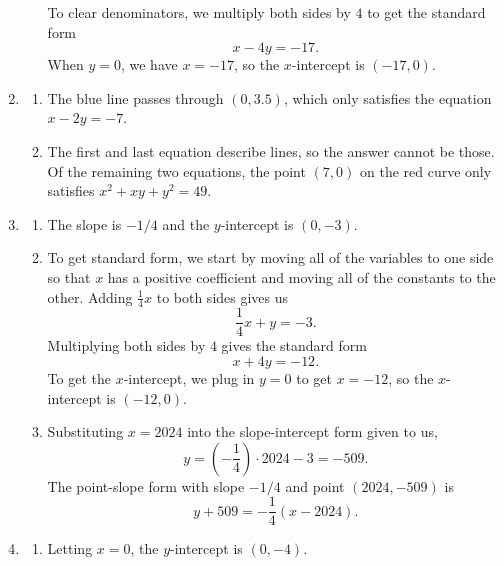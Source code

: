 \begin{enumerate}
\begin{enumerate}
To clear denominators, we multiply both sides by $4$ to get the standard form 
\begin{equation*}
\boxed{x - 4y = -17}.
\end{equation*}
When $y = 0$, we have $x = -17$, so the $x$-intercept is $\boxed{(-17, 0)}$.
\end{enumerate}
\item \begin{enumerate}
\item The blue line passes through $(0, 3.5)$, which only satisfies the equation $\boxed{x - 2y = -7}$.
\item The first and last equation describe lines, so the answer cannot be those. Of the remaining two equations, the point $(7,0)$ on the red curve only satisfies $\boxed{x^2 + xy + y^2 = 49}$.
\end{enumerate}
\item \begin{enumerate}
\item The slope is $\boxed{-1/4}$ and the $y$-intercept is $\boxed{(0,-3)}$.
\item To get standard form, we start by moving all of the variables to one side so that $x$ has a positive coefficient and moving all of the constants to the other. Adding $\frac{1}{4}x$ to both sides gives us 
\begin{equation*}
\frac{1}{4}x + y = -3.
\end{equation*}
Multiplying both sides by $4$ gives the standard form 
\begin{equation*}
\boxed{x + 4y = -12}.
\end{equation*}
To get the $x$-intercept, we plug in $y = 0$ to get $x = -12$, so the $x$-intercept is $\boxed{(-12,0)}$.
\item Substituting $x = 2024$ into the slope-intercept form given to us,
\begin{equation*}
y = \left(-\frac{1}{4}\right)\cdot 2024 - 3 = -509.
\end{equation*}
The point-slope form with slope $-1/4$ and point $(2024, -509)$ is
\begin{equation*}
\boxed{y + 509 = -\frac{1}{4}(x - 2024)}.
\end{equation*}
\end{enumerate}
\item \begin{enumerate}
\item Letting $x = 0$, the $y$-intercept is $\boxed{(0, -4)}$.\par

\end{enumerate}
\end{enumerate}

